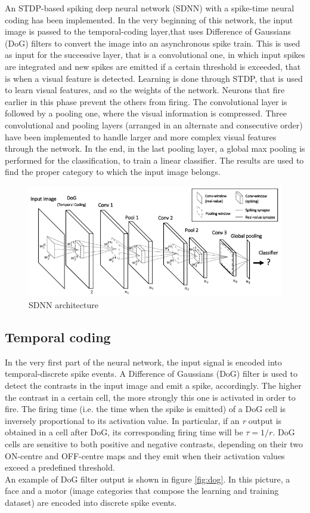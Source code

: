 \documentclass[11pt,a4paper]{scrartcl}
\begin{document}
An STDP-based spiking deep neural network (SDNN) with a spike-time neural coding has been implemented. In the very beginning of this network, the input image is passed to the temporal-coding layer,that uses Difference of Gaussians (DoG) filters to convert the image into an asynchronous spike train. This is used as input for the successive layer, that is a convolutional one,
in which input spikes are integrated and new spikes are emitted if a certain threshold is exceeded, that is when a visual feature is detected. Learning is done through STDP, that is used to learn visual features, and so the weights of the network. Neurons that fire earlier in this phase prevent the others from firing. The convolutional layer is followed by a pooling one, where the visual information is compressed. Three convolutional and pooling layers (arranged in an alternate and consecutive order) have been implemented to handle larger and more complex visual features through the network. In the end, in the last pooling layer, a global max pooling is performed for the classification, to train a linear classifier. The results are used to find the proper category to which the input image belongs.\\
\begin{figure}[h]
	\centering
	\includegraphics[width=\textwidth]{images/architecture}
	\caption{SDNN architecture}
	\label{fig:architecture}
\end{figure}

\subsection{Temporal coding}

In the very first part of the neural network, the input signal is encoded into temporal-discrete spike events. A Difference of Gaussians (DoG) filter is used to detect the contrasts in the input image and emit a spike, accordingly. The higher the contrast in a certain cell, the more strongly this one is activated in order to fire. The firing time (i.e. the time when the spike is emitted) of a DoG cell is inversely proportional to its activation value. In particular, if an \textit{r} output is obtained in a cell after DoG, its corresponding firing time will be $ \tau = 1/r $. DoG cells are sensitive to both positive and negative contrasts, depending on their two ON-centre and OFF-centre maps and they emit when their activation values exceed a predefined threshold.\\
An example of DoG filter output is shown in figure \ref*{fig:dog}. In this picture, a face and a motor (image categories that compose the learning and training dataset) are encoded into discrete spike events.
\end{document}
